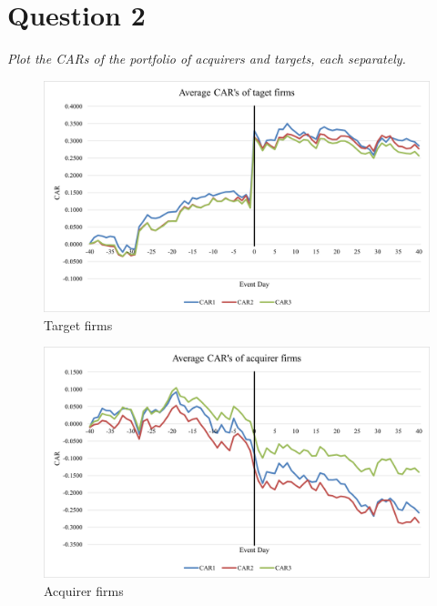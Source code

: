 \documentclass[11pt,a4paper,openany,oneside]{article}%
\begin{document}
\section{Question 2}
\textit{Plot the CARs of the portfolio of acquirers and targets, each separately.}\newline
\begin{figure}[H]
    \centering
    \includegraphics[scale=0.75]{Bild1.png}
    \caption{Target firms}
    \label{bildlitargets}
\end{figure}
\begin{figure}[H]
    \centering
    \includegraphics[scale=0.75]{Bild2.png}
    \caption{Acquirer firms}
    \label{bildlyacqui}
\end{figure}
\end{document}
